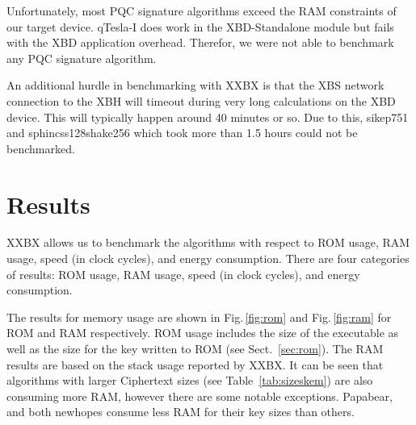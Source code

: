 \documentclass[10pt]{article}
\begin{document}
Unfortunately, most PQC signature algorithms exceed the RAM constraints of our 
target device. qTesla-I does work in the 
XBD-Standalone module but fails with the XBD application overhead. Therefor, we
were not able to benchmark any PQC signature algorithm.

An additional hurdle in benchmarking with XXBX is that 
the XBS network connection to the XBH will timeout during very long calculations on 
the XBD device. This will typically happen around 40 minutes or so.
Due to this, sikep751 and sphincss128shake256 which took more than 1.5 hours
could not be benchmarked.


\section{Results}

XXBX allows us to benchmark the algorithms with respect to ROM usage, RAM usage,
speed (in clock cycles), and energy consumption. 
There are four categories of results: ROM usage, RAM usage, speed (in clock cycles), 
and energy consumption.

The results for memory usage are shown in Fig.\,\ref{fig:rom} and Fig.\,\ref{fig:ram} for
ROM and RAM respectively. ROM usage includes the size of the executable as well as the 
size for the key written to ROM (see Sect.~\ref{sec:rom}). 
The RAM results are based on the stack usage reported by XXBX. It can be seen that
algorithms with larger Ciphertext sizes (see Table~\ref{tab:sizeskem}) are also consuming
more RAM, however there are some notable exceptions. Papabear, and both newhopes consume
less RAM for their key sizes than others.
\end{document}
